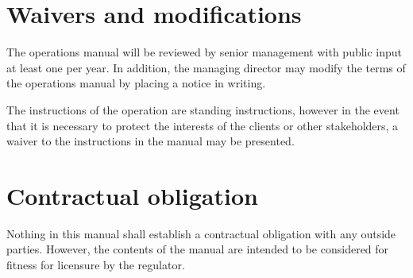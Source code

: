 \section{Waivers and modifications}
The operations manual will be reviewed by senior management with
public input at least one per year.  In addition, the managing
director may modify the terms of the operations manual by placing a
notice in writing.

The instructions of the operation are standing instructions, however
in the event that it is necessary to protect the interests of the
clients or other stakeholders, a waiver to the instructions in the
manual may be presented.

\section{Contractual obligation}
Nothing in this manual shall establish a contractual obligation with
any outside parties.  However, the contents of the manual are intended
to be considered for fitness for licensure by the regulator.
